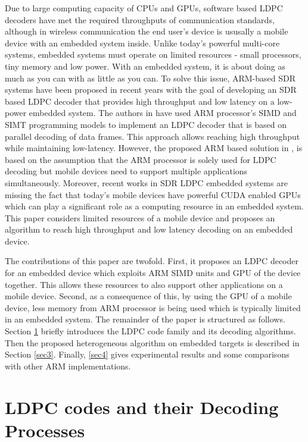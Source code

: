 \documentclass[conference]{IEEEtran}
\begin{document}
Due to large computing capacity of CPUs and GPUs, software based LDPC decoders have met the required throughputs of communication standards, although in wireless communication the end user's device is ususally a mobile device with an embedded system inside. Unlike today's powerful multi-core systems, embedded systems must operate on limited resources - small processors, tiny memory and low power. With an embedded system, it is about doing as much as you can with as little as you can. To solve this issue, ARM-based SDR systems have been proposed in recent years \cite{art_neon, art_ldpc_cpu0} with the goal of developing an SDR based LDPC decoder that provides high throughput and low latency on a low-power embedded system. The authors in \cite{art_neon} have used ARM processor's SIMD and SIMT programming models to implement an LDPC decoder that is based on parallel decoding of data frames. This approach allows reaching high throughput while maintaining low-latency. However, the proposed ARM based solution in \cite{art_neon}, is based on the assumption that the ARM processor is solely used for LDPC decoding but mobile devices need to support multiple applications simultaneously. Moreover, recent works in SDR LDPC embedded systems are missing the fact that today's mobile devices have powerful CUDA enabled GPUs which can play a significant role as a computing resource in an embedded system. This paper considers limited resources of a mobile device and proposes an algorithm to reach high throughput and low latency decoding on an embedded device.

The contributions of this paper are twofold. First, it proposes an LDPC decoder for an embedded device which exploits ARM SIMD units and GPU of the device together. This allows these resources to also support other applications on a mobile device. Second, as a consequence of this, by using the GPU of a mobile device, less memory from ARM processor is being used which is typically limited in an embedded system. The remainder of the paper is structured as follows. Section \ref{sec2} briefly introduces the LDPC code family and its decoding algorithms. Then the proposed heterogeneous algorithm on embedded targets is described in Section \ref{sec3}. Finally, \ref{sec4} gives experimental results and some comparisons with other ARM implementations.

\section{LDPC codes and their Decoding Processes}\label{sec2}
\end{document}
